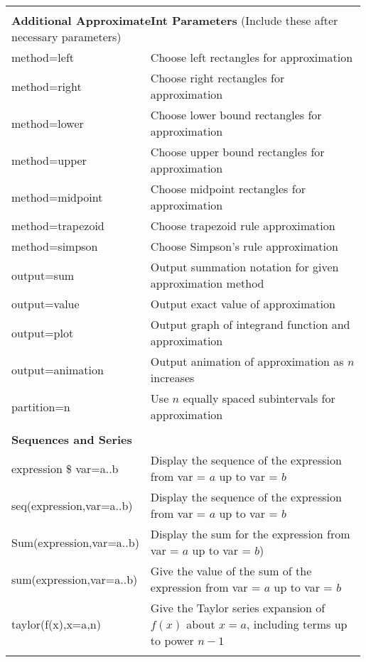 \begin{fullwidth}
\begin{longtable}{p{0.33\linewidth} p{0.66\linewidth}}
          &  \\
    \multicolumn{2}{l}{\quad\quad\textbf{Additional ApproximateInt Parameters} (Include these after necessary parameters)} \\
    \quad\quad method=left & Choose left rectangles for approximation \\
    \quad\quad method=right & Choose right rectangles for approximation \\ 
    \quad\quad method=lower & Choose lower bound rectangles for approximation \\
    \quad\quad method=upper & Choose upper bound rectangles for approximation \\
    \quad\quad method=midpoint & Choose midpoint rectangles for approximation \\ 
    \quad\quad method=trapezoid & Choose trapezoid rule approximation \\
    \quad\quad method=simpson & Choose Simpson's rule approximation \\
    \quad\quad output=sum & Output summation notation for given approximation method \\
    \quad\quad output=value & Output exact value of approximation \\
    \quad\quad output=plot & Output graph of integrand function and approximation \\
    \quad\quad output=animation & Output animation of approximation as $n$ increases \\
    \quad\quad partition=n & Use $n$ equally spaced subintervals for approximation \\
          &  \\
    \multicolumn{2}{l}{\textbf{Sequences and Series}} \\
    \hline
    expression \$ var=a..b & Display the sequence of the expression from var = $a$ up to var = $b$ \\
    seq(expression,var=a..b) & Display the sequence of the expression from var = $a$ up to var = $b$ \\
    Sum(expression,var=a..b) & Display the sum for the expression from var = $a$ up to var = $b$) \\
    sum(expression,var=a..b) & Give the value of the sum of the expression from var = $a$ up to var = $b$ \\
    taylor(f(x),x=a,n) & Give the Taylor series expansion of $f(x)$ about $x=a$, including terms up to power $n-1$ \\
          &  \\

\end{longtable}
\end{fullwidth}
